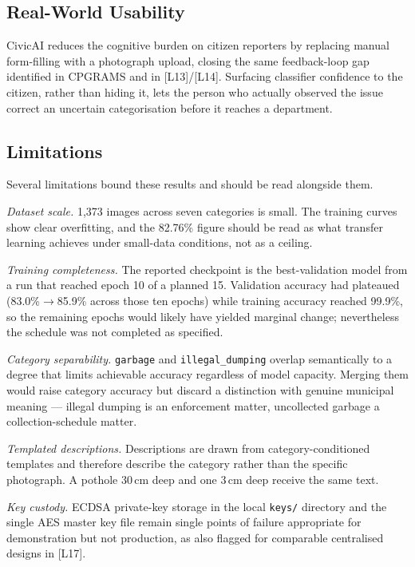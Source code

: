 \documentclass[conference]{IEEEtran}
\begin{document}
\subsection{Real-World Usability}
CivicAI reduces the cognitive burden on citizen reporters by replacing manual form-filling with a photograph upload, closing the same feedback-loop gap identified in CPGRAMS \cite{rao2019cpgrams} and in [L13]/[L14]. Surfacing classifier confidence to the citizen, rather than hiding it, lets the person who actually observed the issue correct an uncertain categorisation before it reaches a department.

\subsection{Limitations}
Several limitations bound these results and should be read alongside them.

\emph{Dataset scale.} 1{,}373 images across seven categories is small. The training curves show clear overfitting, and the 82.76\% figure should be read as what transfer learning achieves under small-data conditions, not as a ceiling.

\emph{Training completeness.} The reported checkpoint is the best-validation model from a run that reached epoch 10 of a planned 15. Validation accuracy had plateaued (83.0\%$\rightarrow$85.9\% across those ten epochs) while training accuracy reached 99.9\%, so the remaining epochs would likely have yielded marginal change; nevertheless the schedule was not completed as specified.

\emph{Category separability.} \texttt{garbage} and \texttt{illegal\_dumping} overlap semantically to a degree that limits achievable accuracy regardless of model capacity. Merging them would raise category accuracy but discard a distinction with genuine municipal meaning --- illegal dumping is an enforcement matter, uncollected garbage a collection-schedule matter.

\emph{Templated descriptions.} Descriptions are drawn from category-conditioned templates and therefore describe the category rather than the specific photograph. A pothole 30\,cm deep and one 3\,cm deep receive the same text.

\emph{Key custody.} ECDSA private-key storage in the local \texttt{keys/} directory and the single AES master key file remain single points of failure appropriate for demonstration but not production, as also flagged for comparable centralised designs in [L17].
\end{document}
